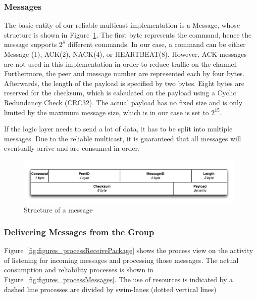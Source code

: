 \subsubsection{Messages}
The basic entity of our reliable multicast implementation is a Message, whose structure is shown in Figure~\ref{fig:messages}. The first byte represents the command, hence the message supports $2^8$ different commands. In our case, a command can be either Message (1), ACK(2), NACK(4), or HEARTBEAT(8). However, ACK messages are not used in this implementation in order to reduce traffic on the channel. Furthermore, the peer and message number are represented each by four bytes. Afterwards, the length of the payload is specified by two bytes. Eight bytes are reserved for the checksum, which is calculated on the payload using a Cyclic Redundancy Check (CRC32). The actual payload has no fixed size and is only limited by the maximum message size, which is in our case is set to $2^{15}$.

If the logic layer needs to send a lot of data, it has to be split into multiple messages. Due to the reliable multicast, it is guaranteed that all messages will eventually arrive and are consumed in order.

\begin{figure}[htbp]
    \centering
        \includegraphics[width=.9\textwidth]{figures/message.pdf}
    \caption{Structure of a message}
    \label{fig:messages}
\end{figure}

\subsubsection{Delivering Messages from the Group}
Figure~\ref{fig:figures_processReceivePackage} shows the process view on the activity of listening for incoming messages and processing those messages. The actual consumption and reliability processes is shown in Figure~\ref{fig:figures_processMessages}.
The use of resources  is indicated by a dashed line 
processes are divided by swim-lanes (dotted vertical lines)

